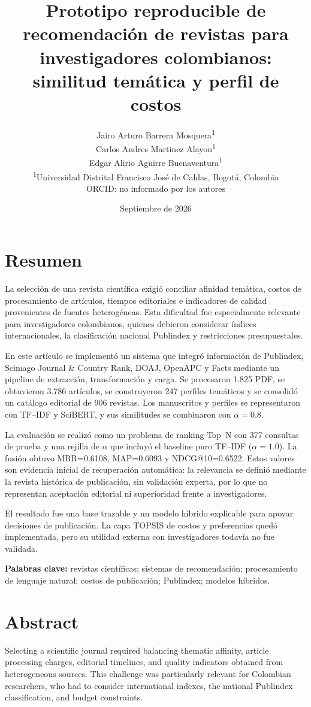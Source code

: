 \documentclass[12pt,a4paper]{article}
\title{Prototipo reproducible de recomendación de revistas para investigadores colombianos: similitud temática y perfil de costos}
\author{Jairo Arturo Barrera Mosquera\textsuperscript{1} \\ Carlos Andres Martinez Alayon\textsuperscript{1} \\ Edgar Alirio Aguirre Buenaventura\textsuperscript{1} \\
\small \textsuperscript{1}Universidad Distrital Francisco José de Caldas, Bogotá, Colombia \\
\small ORCID: no informado por los autores}
\date{Septiembre de 2026}
\begin{document}
\maketitle

\section*{Resumen}
La selección de una revista científica exigió conciliar afinidad temática, costos de procesamiento de artículos, tiempos editoriales e indicadores de calidad provenientes de fuentes heterogéneas. Esta dificultad fue especialmente relevante para investigadores colombianos, quienes debieron considerar índices internacionales, la clasificación nacional Publindex y restricciones presupuestales.

En este artículo se implementó un sistema que integró información de Publindex, Scimago Journal \& Country Rank, DOAJ, OpenAPC y Facts mediante un pipeline de extracción, transformación y carga. Se procesaron 1.825 PDF, se obtuvieron 3.786 artículos, se construyeron 247 perfiles temáticos y se consolidó un catálogo editorial de 906 revistas. Los manuscritos y perfiles se representaron con TF--IDF y SciBERT, y sus similitudes se combinaron con $\alpha=0.8$.

La evaluación se realizó como un problema de ranking Top--N con 377 consultas de prueba y una rejilla de $\alpha$ que incluyó el baseline puro TF--IDF ($\alpha=1.0$). La fusión obtuvo MRR=0.6108, MAP=0.6093 y NDCG@10=0.6522. Estos valores son evidencia inicial de recuperación automática: la relevancia se definió mediante la revista histórica de publicación, sin validación experta, por lo que no representan aceptación editorial ni superioridad frente a investigadores.

El resultado fue una base trazable y un modelo híbrido explicable para apoyar decisiones de publicación. La capa TOPSIS de costos y preferencias quedó implementada, pero su utilidad externa con investigadores todavía no fue validada.

\textbf{Palabras clave:} revistas científicas; sistemas de recomendación; procesamiento de lenguaje natural; costos de publicación; Publindex; modelos híbridos.

\section*{Abstract}
Selecting a scientific journal required balancing thematic affinity, article processing charges, editorial timelines, and quality indicators obtained from heterogeneous sources. This challenge was particularly relevant for Colombian researchers, who had to consider international indexes, the national Publindex classification, and budget constraints.
\end{document}
